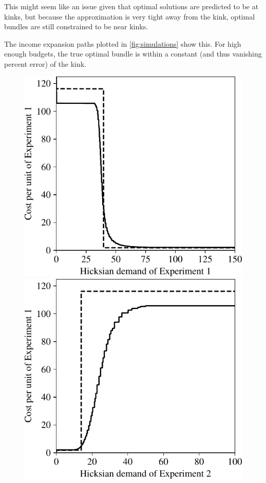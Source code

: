\documentclass{fancyArticle}
\renewcommand{\|}{\,|\,}                    %
\providecommand{\;}{\,;}                    %
\begin{document}
This might seem like an issue given that optimal solutions are predicted to be at kinks, but because the approximation is very tight away from the kink, optimal bundles are still constrained to be near kinks.

The income expansion paths plotted in \autoref{fig:simulations} show this.
For high enough budgets, the true optimal bundle is within a constant (and thus vanishing percent error) of the kink.

\begin{figure}[t]
  \centering
  \begin{minipage}{0.45\linewidth}
    \includegraphics[width=\textwidth]{figures/hicksian1.pdf}
  \end{minipage}
  \hspace{2em}
  \begin{minipage}{0.45\linewidth}
    \includegraphics[width=\textwidth]{figures/hicksian2.pdf}

\end{minipage}
\end{figure}
\end{document}
